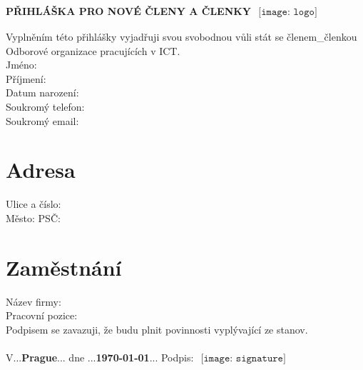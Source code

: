 \documentclass[a4]{article}
\newcommand{\longunderline}[1]{\textbf{\uline{#1\hfill\mbox{}}}}
\begin{document}
	\LARGE


	\textbf{PŘIHLÁŠKA PRO NOVÉ ČLENY A ČLENKY} $ \begin{array}{l}\texttt{[image: logo]}\end{array} $	 \\

	\large

	Vyplněním této přihlášky vyjadřuji svou svobodnou vůli stát se členem\_členkou
	Odborové organizace pracujících v ICT.\\

	Jméno: \longunderline{\Name}\\

	Příjmení: \longunderline{\Surname}\\

	Datum narození: \longunderline{\DateOfBirth}\\

	Soukromý telefon: \longunderline{\Phone}\\

	Soukromý email: \longunderline{\Email}\\

	\section{Adresa}

	Ulice a číslo: \longunderline{\Address}\\

	Město: \longunderline{\City} PSČ: \longunderline{\Zipcode} \\

	\section{Zaměstnání}

	Název firmy: \longunderline{\Company}\\

	Pracovní pozice: \longunderline{\Position}\\

	Podpisem se zavazuji, že budu plnit povinnosti vyplývající ze stanov.\\\\

	V...\textbf{Prague}... dne ...\textbf{\today}... \hspace{50mm} Podpis: $ \begin{array}{l}\texttt{[image: signature]}\end{array} $  \\
\end{document}
